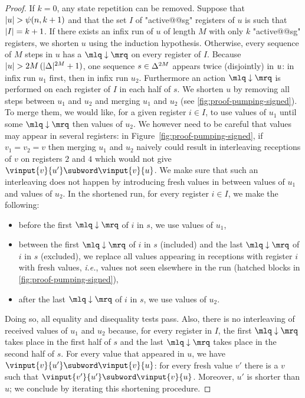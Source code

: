 \begin{proof}
If $k=0$, any state repetition can be removed. Suppose that $|u| > \psi(n,k+1)$ and that the set $I$ of "active@@sg" registers of $u$ is such that $|I| = k+1$. If there exists an infix run of $u$ of length $M$ with only $k$ "active@@sg" registers, we shorten $u$ using the induction hypothesis. Otherwise, every sequence of $M$ steps in $u$ has a $\quotemarks{\enregact}$ on every register of $I$. Because $|u| > 2 M \, (|\Delta|^{2M} +1)$, one sequence $s \in \Delta^{2M}$ appears twice (disjointly) in $u$: in infix run $u_1$ first, then in infix run $u_2$. Furthermore an action $\quotemarks{\enregact}$ is performed on each register of $I$ in each half of $s$. We shorten $u$ by removing all steps between $u_1$ and $u_2$ and merging $u_1$ and $u_2$ (see \cref{fig:proof-pumping-signed}). To merge them, we would like, for a given register $i \in I$, to use values of $u_1$ until some $\quotemarks{\enregact}$ then values of $u_2$. We however need to be careful that values may appear in several registers: in Figure~\ref{fig:proof-pumping-signed}, if $v_1 = v_2 = v$ then merging $u_1$ and $u_2$ naively could result in interleaving receptions of $v$ on registers $2$ and $4$ which would not give $\vinput{v}{u'} \subword \vinput{v}{u}$. We make sure that such an interleaving does not happen by introducing fresh values in between values of $u_1$ and values of $u_2$. In the shortened run, for every register $i \in I$, we make the following:
\begin{itemize}
\item before the first $\quotemarks{\enregact}$ of $i$ in $s$, we use values of $u_1$,
\item between the first $\quotemarks{\enregact}$ of $i$ in $s$ (included) and the last $\quotemarks{\enregact}$ of $i$ in $s$ (excluded), we replace all values appearing in receptions with register $i$ with fresh values, \emph{i.e.}, values not seen elsewhere in the run (hatched blocks in \cref{fig:proof-pumping-signed}),
\item after the last $\quotemarks{\enregact}$ of $i$ in $s$, we use values of $u_2$.
\end{itemize}
Doing so, all equality and disequality tests pass. Also, there is no interleaving of received values of $u_1$ and $u_2$ because, for every register in $I$, the first $\quotemarks{\enregact}$ takes place in the first half of $s$ and the last $\quotemarks{\enregact}$ takes place in the second half of $s$. For every value that appeared in $u$, we have $\vinput{v}{u'} \subword \vinput{v}{u}$:  for every fresh value $v'$ there is a $v$ such that $\vinput{v'}{u'} \subword \vinput{v}{u}$. Moreover, $u'$ is shorter than $u$; we conclude by iterating this shortening procedure. 
\end{proof}
